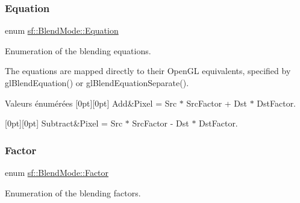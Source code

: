 \subsubsection{\texorpdfstring{Equation}{Equation}}
{\footnotesize\ttfamily enum \hyperlink{structsf_1_1BlendMode_a7bce470e2e384c4f9c8d9595faef7c32}{sf\+::\+Blend\+Mode\+::\+Equation}}



Enumeration of the blending equations. 

The equations are mapped directly to their Open\+GL equivalents, specified by gl\+Blend\+Equation() or gl\+Blend\+Equation\+Separate(). \begin{DoxyEnumFields}{Valeurs énumérées}
[0pt][0pt]{}\mbox{\label{structsf_1_1BlendMode_a7bce470e2e384c4f9c8d9595faef7c32a50c081d8f36cf7b77632966e15d38966}} 
Add&Pixel = Src $\ast$ Src\+Factor + Dst $\ast$ Dst\+Factor. \\
\hline

[0pt][0pt]{}\mbox{\label{structsf_1_1BlendMode_a7bce470e2e384c4f9c8d9595faef7c32a14c825be24f8412fc5ed5b49f19bc0d0}} 
Subtract&Pixel = Src $\ast$ Src\+Factor -\/ Dst $\ast$ Dst\+Factor. \\
\hline

\end{DoxyEnumFields}
\mbox{\label{structsf_1_1BlendMode_afb9852caf356b53bb0de460c58a9ebbb}} 
\subsubsection{\texorpdfstring{Factor}{Factor}}
{\footnotesize\ttfamily enum \hyperlink{structsf_1_1BlendMode_afb9852caf356b53bb0de460c58a9ebbb}{sf\+::\+Blend\+Mode\+::\+Factor}}



Enumeration of the blending factors. 


